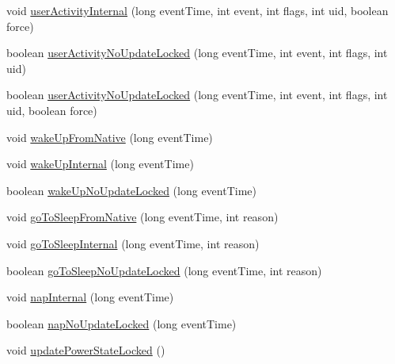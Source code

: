 \begin{DoxyCompactItemize}
\item 
void \hyperlink{classcom_1_1android_1_1server_1_1power_1_1PowerManagerService_a6905de30775b56c1ab51c9a1b868d168}{user\-Activity\-Internal} (long event\-Time, int event, int flags, int uid, boolean force)
\item 
boolean \hyperlink{classcom_1_1android_1_1server_1_1power_1_1PowerManagerService_a90385ca3318864e1e239e7771f4a4acc}{user\-Activity\-No\-Update\-Locked} (long event\-Time, int event, int flags, int uid)
\item 
boolean \hyperlink{classcom_1_1android_1_1server_1_1power_1_1PowerManagerService_a113f66279bf31322a3b895e50c9ef76c}{user\-Activity\-No\-Update\-Locked} (long event\-Time, int event, int flags, int uid, boolean force)
\item 
void \hyperlink{classcom_1_1android_1_1server_1_1power_1_1PowerManagerService_ae54065d654ddb6739c8135addb636a1a}{wake\-Up\-From\-Native} (long event\-Time)
\item 
void \hyperlink{classcom_1_1android_1_1server_1_1power_1_1PowerManagerService_ab62226cc44fa872bd628429780f085fc}{wake\-Up\-Internal} (long event\-Time)
\item 
boolean \hyperlink{classcom_1_1android_1_1server_1_1power_1_1PowerManagerService_a69e83f125f27c4e5101b4f6a4053b293}{wake\-Up\-No\-Update\-Locked} (long event\-Time)
\item 
void \hyperlink{classcom_1_1android_1_1server_1_1power_1_1PowerManagerService_a1afff6c2ab0caa1d6beadc1cef259eba}{go\-To\-Sleep\-From\-Native} (long event\-Time, int reason)
\item 
void \hyperlink{classcom_1_1android_1_1server_1_1power_1_1PowerManagerService_a8ad81dd921c4a6f30bc5b23c12e9c8a9}{go\-To\-Sleep\-Internal} (long event\-Time, int reason)
\item 
boolean \hyperlink{classcom_1_1android_1_1server_1_1power_1_1PowerManagerService_a1fa18c03e778a5a28bb8cb3a04bccec4}{go\-To\-Sleep\-No\-Update\-Locked} (long event\-Time, int reason)
\item 
void \hyperlink{classcom_1_1android_1_1server_1_1power_1_1PowerManagerService_a0825ee46a31aad6ec4512e2f9049f32e}{nap\-Internal} (long event\-Time)
\item 
boolean \hyperlink{classcom_1_1android_1_1server_1_1power_1_1PowerManagerService_aebe3966fda8e017f14b84af642ed9469}{nap\-No\-Update\-Locked} (long event\-Time)
\item 
void \hyperlink{classcom_1_1android_1_1server_1_1power_1_1PowerManagerService_a82137423603e85ce338a33301f627f12}{update\-Power\-State\-Locked} ()

\end{DoxyCompactItemize}
